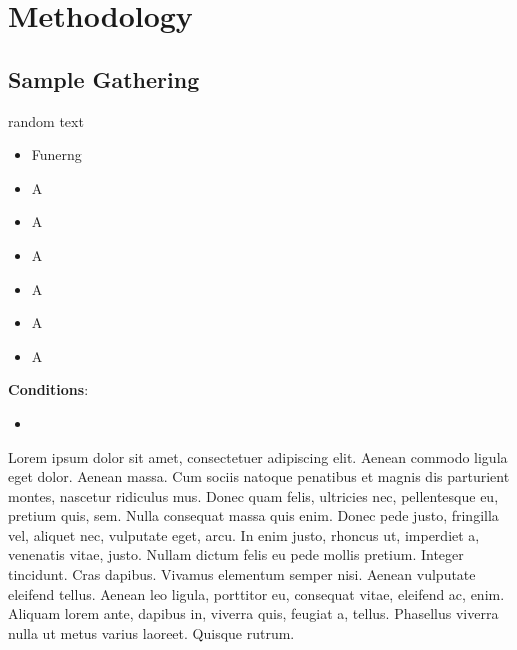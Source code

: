 \section{Methodology}

\subsection{Sample Gathering}




\begin{multicols}{2}
random text \columnbreak
\begin{itemize}
    \item Funerng \\
    \item A \\
    \item A \\
    \item A \\
    \item A \\
    \item A \\
    \item A \\

    
\end{itemize}
\end{multicols}



\textbf{Conditions}:
\begin{itemize}
    \item 
\end{itemize}

Lorem ipsum dolor sit amet, consectetuer adipiscing elit. Aenean commodo ligula eget dolor. Aenean massa. Cum sociis natoque penatibus et magnis dis parturient montes, nascetur ridiculus mus. Donec quam felis, ultricies nec, pellentesque eu, pretium quis, sem. Nulla consequat massa quis enim. Donec pede justo, fringilla vel, aliquet nec, vulputate eget, arcu. In enim justo, rhoncus ut, imperdiet a, venenatis vitae, justo. Nullam dictum felis eu pede mollis pretium. Integer tincidunt. Cras dapibus. Vivamus elementum semper nisi. Aenean vulputate eleifend tellus. Aenean leo ligula, porttitor eu, consequat vitae, eleifend ac, enim. Aliquam lorem ante, dapibus in, viverra quis, feugiat a, tellus. Phasellus viverra nulla ut metus varius laoreet. Quisque rutrum. \columnbreak

